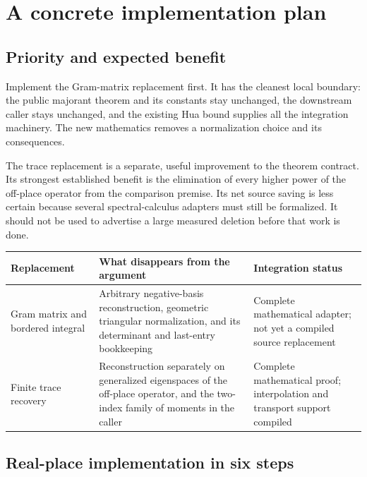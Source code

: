\section{A concrete implementation plan}\label{sec:implementation}

\subsection{Priority and expected benefit}

Implement the Gram-matrix replacement first. It has the cleanest local boundary:
the public majorant theorem and its constants stay unchanged, the downstream caller
stays unchanged, and the existing Hua bound supplies all the integration machinery.
The new mathematics removes a normalization choice and its consequences.

The trace replacement is a separate, useful improvement to the theorem contract.
Its strongest established benefit is the elimination of every higher power of the
off-place operator from the comparison premise. Its net source saving is less
certain because several spectral-calculus adapters must still be formalized.
It should not be used to advertise a large measured deletion before that work is done.

\begin{center}
\begin{tabularx}{\linewidth}{@{}L{.20\linewidth}YL{.26\linewidth}@{}}
\toprule
Replacement & What disappears from the argument & Integration status\\
\midrule
Gram matrix and bordered integral & Arbitrary negative-basis reconstruction, geometric triangular normalization, and its determinant and last-entry bookkeeping & Complete mathematical adapter; not yet a compiled source replacement\\
Finite trace recovery & Reconstruction separately on generalized eigenspaces of the off-place operator, and the two-index family of moments in the caller & Complete mathematical proof; interpolation and transport support compiled\\
\bottomrule
\end{tabularx}
\end{center}

\subsection{Real-place implementation in six steps}

